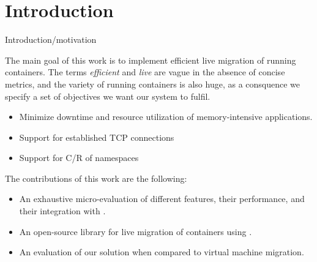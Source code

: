 \chapter{Introduction} \label{chap:introduction}

Introduction/motivation

The main goal of this work is to implement efficient live migration of running containers.
The terms \textit{efficient} and \textit{live} are vague in the absence of concise metrics, and the variety of running containers is also huge, as a consquence we specify a set of objectives we want our system to fulfil.
\begin{itemize}
    \item Minimize downtime and resource utilization of memory-intensive applications.
    \item Support for established TCP connections
    \item Support for C/R of namespaces
\end{itemize}

The contributions of this work are the following:
\begin{itemize}
    \item An exhaustive micro-evaluation of different \criu features, their performance, and their integration with \runc.
    \item An open-source library for live migration of \runc containers using \criu.
    \item An evaluation of our solution when compared to virtual machine migration.
\end{itemize}

